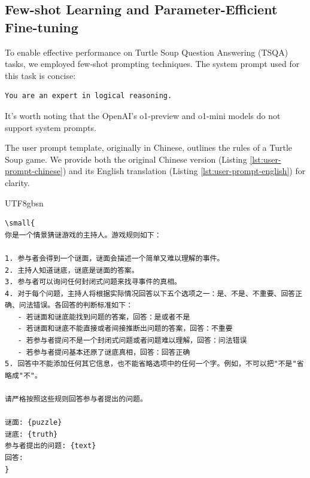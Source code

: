 \subsection{Few-shot Learning and Parameter-Efficient Fine-tuning}

To enable effective performance on Turtle Soup Question Answering (TSQA) tasks, we employed few-shot prompting techniques. The system prompt used for this task is concise:

\begin{verbatim}
You are an expert in logical reasoning.
\end{verbatim}

It's worth noting that the OpenAI's o1-preview and o1-mini models do not support system prompts.

The user prompt template, originally in Chinese, outlines the rules of a Turtle Soup game. We provide both the original Chinese version (Listing \ref{lst:user-prompt-chinese}) and its English translation (Listing \ref{lst:user-prompt-english}) for clarity.


\begin{CJK*}{UTF8}{gbsn}
\begin{listing}[htbp]
\begin{verbatim}
\small{
你是一个情景猜谜游戏的主持人。游戏规则如下：

1. 参与者会得到一个谜面，谜面会描述一个简单又难以理解的事件。
2. 主持人知道谜底，谜底是谜面的答案。
3. 参与者可以询问任何封闭式问题来找寻事件的真相。
4. 对于每个问题，主持人将根据实际情况回答以下五个选项之一：是、不是、不重要、回答正确、问法错误。各回答的判断标准如下：
   - 若谜面和谜底能找到问题的答案，回答：是或者不是
   - 若谜面和谜底不能直接或者间接推断出问题的答案，回答：不重要
   - 若参与者提问不是一个封闭式问题或者问题难以理解，回答：问法错误
   - 若参与者提问基本还原了谜底真相，回答：回答正确
5. 回答中不能添加任何其它信息，也不能省略选项中的任何一个字。例如，不可以把"不是"省略成"不"。

请严格按照这些规则回答参与者提出的问题。

谜面: {puzzle}
谜底: {truth}
参与者提出的问题: {text}
回答: 
}
\end{verbatim}
\caption{User Prompt Template for TSQA (Chinese)}
\label{lst:user-prompt-chinese}
\end{listing}
\end{CJK*}

